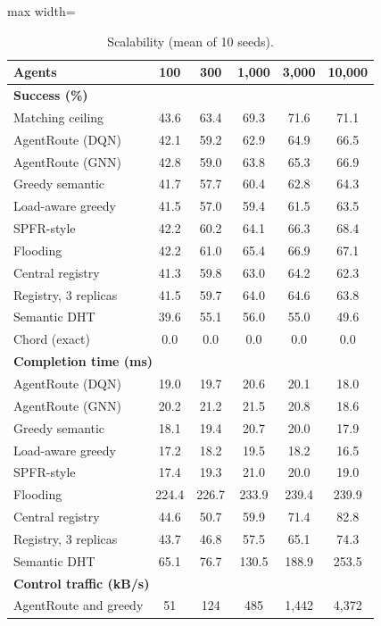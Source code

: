 \documentclass[journal]{IEEEtran}
\begin{document}
\begin{table}[!t]
\centering
\caption{Scalability (mean of 10 seeds).}
\label{tab:1}
\footnotesize
\begin{adjustbox}{max width=\columnwidth}
\begin{tabular}{lccccc}
\toprule
Agents & 100 & 300 & 1,000 & 3,000 & 10,000 \\
\midrule
\multicolumn{6}{l}{\textbf{Success (\%)}} \\
Matching ceiling & 43.6 & 63.4 & 69.3 & 71.6 & 71.1 \\
AgentRoute (DQN) & 42.1 & 59.2 & 62.9 & 64.9 & 66.5 \\
AgentRoute (GNN) & 42.8 & 59.0 & 63.8 & 65.3 & 66.9 \\
Greedy semantic & 41.7 & 57.7 & 60.4 & 62.8 & 64.3 \\
Load-aware greedy & 41.5 & 57.0 & 59.4 & 61.5 & 63.5 \\
SPFR-style & 42.2 & 60.2 & 64.1 & 66.3 & 68.4 \\
Flooding & 42.2 & 61.0 & 65.4 & 66.9 & 67.1 \\
Central registry & 41.3 & 59.8 & 63.0 & 64.2 & 62.3 \\
Registry, 3 replicas & 41.5 & 59.7 & 64.0 & 64.6 & 63.8 \\
Semantic DHT & 39.6 & 55.1 & 56.0 & 55.0 & 49.6 \\
Chord (exact) & 0.0 & 0.0 & 0.0 & 0.0 & 0.0 \\
\multicolumn{6}{l}{\textbf{Completion time (ms)}} \\
AgentRoute (DQN) & 19.0 & 19.7 & 20.6 & 20.1 & 18.0 \\
AgentRoute (GNN) & 20.2 & 21.2 & 21.5 & 20.8 & 18.6 \\
Greedy semantic & 18.1 & 19.4 & 20.7 & 20.0 & 17.9 \\
Load-aware greedy & 17.2 & 18.2 & 19.5 & 18.2 & 16.5 \\
SPFR-style & 17.4 & 19.3 & 21.0 & 20.0 & 19.0 \\
Flooding & 224.4 & 226.7 & 233.9 & 239.4 & 239.9 \\
Central registry & 44.6 & 50.7 & 59.9 & 71.4 & 82.8 \\
Registry, 3 replicas & 43.7 & 46.8 & 57.5 & 65.1 & 74.3 \\
Semantic DHT & 65.1 & 76.7 & 130.5 & 188.9 & 253.5 \\
\multicolumn{6}{l}{\textbf{Control traffic (kB/s)}} \\
AgentRoute and greedy & 51 & 124 & 485 & 1,442 & 4,372 \\

\end{tabular}
\end{adjustbox}
\end{table}
\end{document}
